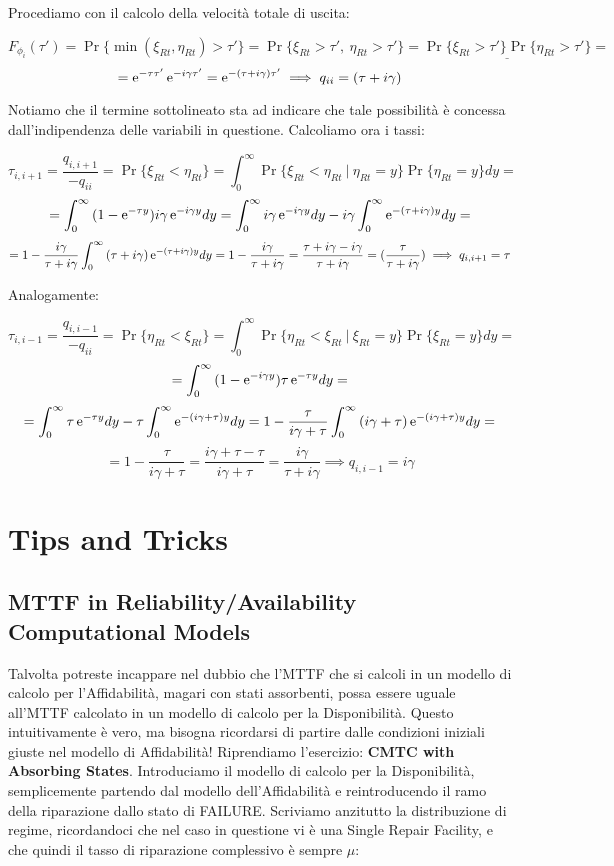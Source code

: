 Procediamo con il calcolo della velocità totale di uscita:

\[
	F_{\phi_i}(\tau') = \Pr\{\min(\xi_{Rt},\eta_{Rt}) > \tau'\} = \Pr\{\xi_{Rt}>\tau',\ \eta_{Rt}>\tau'\} = \underline{\Pr\{\xi_{Rt}>\tau'\}\Pr\{\eta_{Rt}>\tau'\}} =
\]
\[
	= \mathop{}\!\mathrm{e}^{-\tau\tau'}\mathop{}\!\mathrm{e}^{-i\gamma\tau'} = \mathop{}\!\mathrm{e}^{-(\tau+i\gamma)\tau'} \implies q_{ii} = (\tau+i\gamma)
\]

Notiamo che il termine sottolineato sta ad indicare che tale possibilità è concessa dall'indipendenza delle variabili in questione. Calcoliamo ora i tassi:

\[
	\tau_{i,i+1} = \frac{q_{i,i+1}}{-q_{ii}} = \Pr\{\xi_{Rt}<\eta_{Rt}\} = \int_0^\infty{\Pr\{\xi_{Rt}<\eta_{Rt}\ |\ \eta_{Rt}=y\}\Pr\{\eta_{Rt}=y\}dy} =
\]
\[
	= \int_0^\infty{(1-\mathop{}\!\mathrm{e}^{-\tau y})i\gamma\mathop{}\!\mathrm{e}^{-i\gamma y}dy} = \int_0^\infty{i\gamma\mathop{}\!\mathrm{e}^{-i\gamma y}dy}-i\gamma\int_0^\infty{\mathop{}\!\mathrm{e}^{-(\tau+i\gamma)y}dy} =
\]
\[
	= 1-\frac{i\gamma}{\tau+i\gamma}\int_0^\infty{(\tau+i\gamma)\mathop{}\!\mathrm{e}^{-(\tau+i\gamma)y}dy} = 1-\frac{i\gamma}{\tau+i\gamma} = \frac{\tau+i\gamma-i\gamma}{\tau+i\gamma} = (\frac{\tau}{\tau+i\gamma}) \implies q_{i,i+1} = \tau
\]

Analogamente:

\[
	\tau_{i,i-1} = \frac{q_{i,i-1}}{-q_{ii}} = \Pr\{\eta_{Rt}<\xi_{Rt}\} = \int_0^\infty{\Pr\{\eta_{Rt}<\xi_{Rt}\ |\ \xi_{Rt}=y\}\Pr\{\xi_{Rt}=y\}dy} =
\]
\[
	= \int_0^\infty{(1-\mathop{}\!\mathrm{e}^{-i\gamma y})\tau\mathop{}\!\mathrm{e}^{-\tau y}dy} =
\]
\[
	= \int_0^\infty{\tau\mathop{}\!\mathrm{e}^{-\tau y}dy} - \tau\int_0^\infty{\mathop{}\!\mathrm{e}^{-(i\gamma +\tau)y}dy} = 1-\frac{\tau}{i\gamma+\tau}\int_0^\infty{(i\gamma+\tau)\mathop{}\!\mathrm{e}^{-(i\gamma + \tau)y}dy} =
\]
\[
	= 1-\frac{\tau}{i\gamma + \tau} = \frac{i\gamma + \tau-\tau}{i\gamma + \tau} = \frac{i\gamma}{\tau+i\gamma} \implies q_{i,i-1} = i\gamma
\]


\section{Tips and Tricks}

\subsection{MTTF in Reliability/Availability Computational Models}

Talvolta potreste incappare nel dubbio che l'MTTF che si calcoli in un modello di calcolo per l'Affidabilità, magari con stati assorbenti, possa essere uguale all'MTTF calcolato in un modello di calcolo per la Disponibilità. Questo intuitivamente è vero, ma bisogna ricordarsi di partire dalle condizioni iniziali giuste nel modello di Affidabilità! Riprendiamo l'esercizio: \textbf{CMTC with Absorbing States}. Introduciamo il modello di calcolo per la Disponibilità, semplicemente partendo dal modello dell'Affidabilità e reintroducendo il ramo della riparazione dallo stato di FAILURE. Scriviamo anzitutto la distribuzione di regime, ricordandoci che nel caso in questione vi è una Single Repair Facility, e che quindi il tasso di riparazione complessivo è sempre $\mu$:

